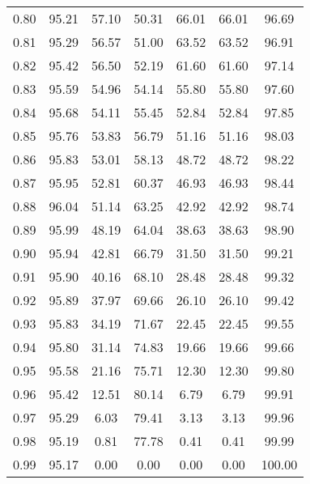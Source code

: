 \begin{tabular}{|c|c|c|c|c|c|c|}
      0.80 &     95.21 &     57.10 &      50.31 &   66.01 &      66.01 &         96.69 \\
      0.81 &     95.29 &     56.57 &      51.00 &   63.52 &      63.52 &         96.91 \\
      0.82 &     95.42 &     56.50 &      52.19 &   61.60 &      61.60 &         97.14 \\
      0.83 &     95.59 &     54.96 &      54.14 &   55.80 &      55.80 &         97.60 \\
      0.84 &     95.68 &     54.11 &      55.45 &   52.84 &      52.84 &         97.85 \\
      0.85 &     95.76 &     53.83 &      56.79 &   51.16 &      51.16 &         98.03 \\
      0.86 &     95.83 &     53.01 &      58.13 &   48.72 &      48.72 &         98.22 \\
      0.87 &     95.95 &     52.81 &      60.37 &   46.93 &      46.93 &         98.44 \\
      0.88 &     96.04 &     51.14 &      63.25 &   42.92 &      42.92 &         98.74 \\
      0.89 &     95.99 &     48.19 &      64.04 &   38.63 &      38.63 &         98.90 \\
      0.90 &     95.94 &     42.81 &      66.79 &   31.50 &      31.50 &         99.21 \\
      0.91 &     95.90 &     40.16 &      68.10 &   28.48 &      28.48 &         99.32 \\
      0.92 &     95.89 &     37.97 &      69.66 &   26.10 &      26.10 &         99.42 \\
      0.93 &     95.83 &     34.19 &      71.67 &   22.45 &      22.45 &         99.55 \\
      0.94 &     95.80 &     31.14 &      74.83 &   19.66 &      19.66 &         99.66 \\
      0.95 &     95.58 &     21.16 &      75.71 &   12.30 &      12.30 &         99.80 \\
      0.96 &     95.42 &     12.51 &      80.14 &    6.79 &       6.79 &         99.91 \\
      0.97 &     95.29 &      6.03 &      79.41 &    3.13 &       3.13 &         99.96 \\
      0.98 &     95.19 &      0.81 &      77.78 &    0.41 &       0.41 &         99.99 \\
      0.99 &     95.17 &      0.00 &       0.00 &    0.00 &       0.00 &        100.00 \\
\bottomrule
\end{tabular}
